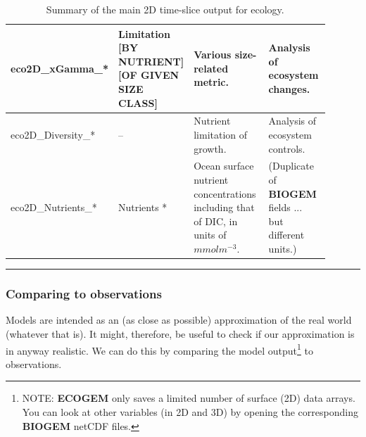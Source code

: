 \begin{table}[htp!]
\begin{tabular}{p{0.25\linewidth} p{0.20\linewidth} p{0.25\linewidth} p{0.20\linewidth}}
\midrule

\textsf{\footnotesize eco2D\_xGamma\_*} & \textsf{\footnotesize Limitation [BY NUTRIENT] [OF GIVEN SIZE CLASS]} & 
\small{Various size-related metric.} & \small{Analysis of ecosystem changes.}\\

\midrule

\textsf{\footnotesize eco2D\_Diversity\_*} & \textsf{\footnotesize --} & 
\small{Nutrient limitation of growth.} & \small{Analysis of ecosystem controls.}\\

\midrule

\textsf{\footnotesize eco2D\_Nutrients\_*} & \textsf{\footnotesize Nutrients *} & 
\small{Ocean surface nutrient concentrations including that of DIC, in units of \(mmol m^{-3}\).} & \small{(Duplicate of \textbf{BIOGEM} fields ... but different units.)}\\

\bottomrule
\end{tabular}
\caption{Summary of the main 2D time-slice output for ecology.}
\end{table}

\vspace{1mm}\noindent\rule{4cm}{0.5pt}\vspace{2mm}

\subsubsection{Comparing to observations}
\vspace{1mm}

Models are intended as an (as close as possible) approximation of the real world (whatever that is). It might, therefore, be useful to check if our approximation is in anyway realistic. We can do this by comparing the model output\footnote{NOTE: \textbf{ECOGEM} only saves a limited number of surface (2D) data arrays. You can look at other variables (in 2D and 3D) by opening the corresponding \textbf{BIOGEM} netCDF files.} to observations.

